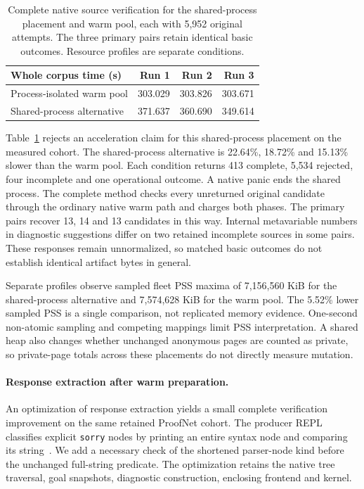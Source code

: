 \documentclass[10pt,twocolumn]{article}
\begin{document}
\begin{table}[t]
\centering
\small
\begin{tabular}{@{}lrrr@{}}
\toprule
Whole corpus time (s) & Run 1 & Run 2 & Run 3 \\
\midrule
Process-isolated warm pool & 303.029 & 303.826 & 303.671 \\
Shared-process alternative & 371.637 & 360.690 & 349.614 \\
\bottomrule
\end{tabular}
\caption{Complete native source verification for the shared-process placement
and warm pool, each with 5,952 original attempts. The three primary pairs
retain identical basic outcomes. Resource profiles are separate conditions.}
\label{tab:shared-process}
\end{table}

Table~\ref{tab:shared-process} rejects an acceleration claim for this
shared-process placement on the measured cohort. The shared-process alternative is 22.64\%, 18.72\%
and 15.13\% slower than the warm pool. Each condition returns 413 complete,
5,534 rejected, four incomplete and one operational outcome. A native panic
ends the shared process. The complete method checks every unreturned original
candidate through the ordinary native warm path and charges both phases.
The primary pairs recover 13, 14 and 13 candidates in this way.
Internal metavariable numbers in diagnostic suggestions differ on two
retained incomplete sources in some pairs. These responses remain unnormalized,
so matched basic outcomes do not establish identical artifact bytes in general.

Separate profiles observe sampled fleet PSS maxima of 7,156,560 KiB for the
shared-process alternative and 7,574,628 KiB for the warm pool.
The 5.52\% lower sampled PSS is a single comparison, not replicated memory
evidence. One-second non-atomic sampling and competing mappings limit PSS
interpretation. A shared heap also changes whether unchanged anonymous pages
are counted as private, so private-page totals across these placements do not
directly measure mutation.

\paragraph{Response extraction after warm preparation.}
An optimization of response extraction yields a small complete verification improvement
on the same retained ProofNet cohort. The producer REPL classifies explicit
\texttt{sorry} nodes by printing an entire syntax node and comparing its
string~\cite{repl}. We add a necessary check of the shortened parser-node kind
before the unchanged full-string predicate. The optimization retains the native tree traversal,
goal snapshots, diagnostic construction, enclosing frontend and kernel.
\end{document}
